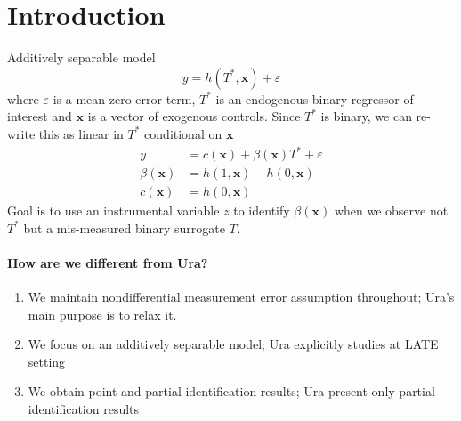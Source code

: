 \section{Introduction}
Additively separable model
\[
  y = h(T^*,\mathbf{x})+\varepsilon
\]
where $\varepsilon$ is a mean-zero error term, $T^*$ is an endogenous binary regressor of interest and $\mathbf{x}$ is a vector of exogenous controls.
Since $T^*$ is binary, we can re-write this as linear in $T^*$ conditional on $\mathbf{x}$
\begin{align*}
  y &= c(\mathbf{x}) + \beta(\mathbf{x}) T^* + \varepsilon\\
  \beta(\mathbf{x}) &= h(1,\mathbf{x}) - h(0,\mathbf{x})\\
  c(\mathbf{x}) &= h(0,\mathbf{x})
\end{align*}
Goal is to use an instrumental variable $z$ to identify $\beta(\mathbf{x})$ when we observe not $T^*$ but a mis-measured binary surrogate $T$. 


\paragraph{How are we different from Ura?}
\begin{enumerate}
  \item We maintain nondifferential measurement error assumption throughout; Ura's main purpose is to relax it.
  \item We focus on an additively separable model; Ura explicitly studies at LATE setting
  \item We obtain point and partial identification results; Ura present only partial identification results
\end{enumerate}

